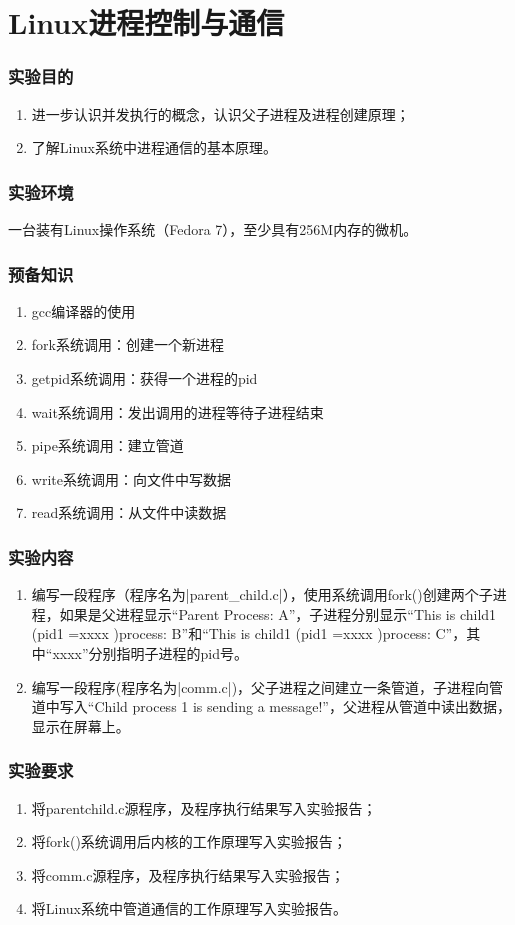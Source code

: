 \documentclass[cs4size,a4paper,nofonts]{ctexart}
\def\titlec{Linux进程控制与通信}
\begin{document}

\setcounter{part}{1}
\part{\titlec}

\section{实验目的}
\begin{enumerate}
\item 进一步认识并发执行的概念，认识父子进程及进程创建原理；
\item 了解Linux系统中进程通信的基本原理。
\end{enumerate}

\section{实验环境}
一台装有Linux操作系统（Fedora 7），至少具有256M内存的微机。

\section{预备知识}
\begin{enumerate}
\item gcc编译器的使用
\item fork系统调用：创建一个新进程
\item getpid系统调用：获得一个进程的pid
\item wait系统调用：发出调用的进程等待子进程结束
\item pipe系统调用：建立管道
\item write系统调用：向文件中写数据
\item read系统调用：从文件中读数据
\end{enumerate}

\section{实验内容}
\begin{enumerate}[label={(\arabic*)}]
\item 编写一段程序（程序名为|parent_child.c|），使用系统调用fork()创建两个子进程，如果是父进程显示“Parent Process: A”，子进程分别显示“This is child1 (pid1 =xxxx )process: B”和“This is child1 (pid1 =xxxx )process: C”，其中“xxxx”分别指明子进程的pid号。
\item 编写一段程序(程序名为|comm.c|)，父子进程之间建立一条管道，子进程向管道中写入“Child process 1 is sending a message!”，父进程从管道中读出数据，显示在屏幕上。
\end{enumerate}

\section{实验要求}
\begin{enumerate}
\item 将parentchild.c源程序，及程序执行结果写入实验报告；
\item 将fork()系统调用后内核的工作原理写入实验报告；
\item 将comm.c源程序，及程序执行结果写入实验报告；
\item 将Linux系统中管道通信的工作原理写入实验报告。
\end{enumerate}
\end{document}
